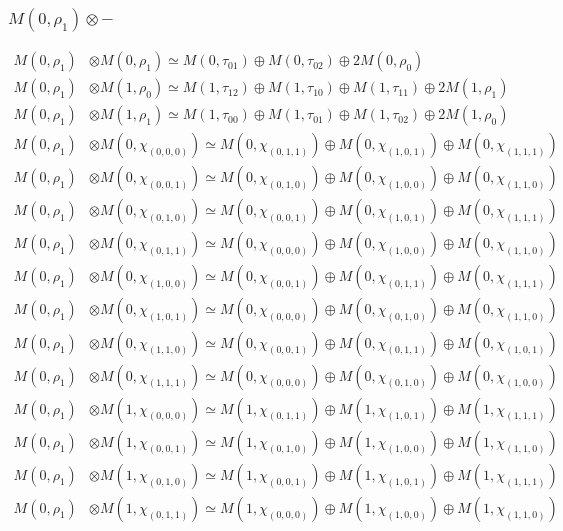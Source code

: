 \subsubsection{$ M(0,\rho_{1})\otimes -$}
\begin{align*}
M(0,\rho_{1}) &\otimes M(0,\rho_{1}) \simeq M(0,\tau_{01}) \oplus M(0,\tau_{02}) \oplus 2 M(0,\rho_{0}) \\
M(0,\rho_{1}) &\otimes M(1,\rho_{0}) \simeq M(1,\tau_{12}) \oplus M(1,\tau_{10}) \oplus M(1,\tau_{11}) \oplus 2 M(1,\rho_{1}) \\
M(0,\rho_{1}) &\otimes M(1,\rho_{1}) \simeq M(1,\tau_{00}) \oplus M(1,\tau_{01}) \oplus M(1,\tau_{02}) \oplus 2 M(1,\rho_{0}) \\
M(0,\rho_{1}) &\otimes M(0,\chi_{(0,0,0)}) \simeq M(0,\chi_{(0,1,1)}) \oplus M(0,\chi_{(1,0,1)}) \oplus M(0,\chi_{(1,1,1)}) \\
M(0,\rho_{1}) &\otimes M(0,\chi_{(0,0,1)}) \simeq M(0,\chi_{(0,1,0)}) \oplus M(0,\chi_{(1,0,0)}) \oplus M(0,\chi_{(1,1,0)}) \\
M(0,\rho_{1}) &\otimes M(0,\chi_{(0,1,0)}) \simeq M(0,\chi_{(0,0,1)}) \oplus M(0,\chi_{(1,0,1)}) \oplus M(0,\chi_{(1,1,1)}) \\
M(0,\rho_{1}) &\otimes M(0,\chi_{(0,1,1)}) \simeq M(0,\chi_{(0,0,0)}) \oplus M(0,\chi_{(1,0,0)}) \oplus M(0,\chi_{(1,1,0)}) \\
M(0,\rho_{1}) &\otimes M(0,\chi_{(1,0,0)}) \simeq M(0,\chi_{(0,0,1)}) \oplus M(0,\chi_{(0,1,1)}) \oplus M(0,\chi_{(1,1,1)}) \\
M(0,\rho_{1}) &\otimes M(0,\chi_{(1,0,1)}) \simeq M(0,\chi_{(0,0,0)}) \oplus M(0,\chi_{(0,1,0)}) \oplus M(0,\chi_{(1,1,0)}) \\
M(0,\rho_{1}) &\otimes M(0,\chi_{(1,1,0)}) \simeq M(0,\chi_{(0,0,1)}) \oplus M(0,\chi_{(0,1,1)}) \oplus M(0,\chi_{(1,0,1)}) \\
M(0,\rho_{1}) &\otimes M(0,\chi_{(1,1,1)}) \simeq M(0,\chi_{(0,0,0)}) \oplus M(0,\chi_{(0,1,0)}) \oplus M(0,\chi_{(1,0,0)}) \\
M(0,\rho_{1}) &\otimes M(1,\chi_{(0,0,0)}) \simeq M(1,\chi_{(0,1,1)}) \oplus M(1,\chi_{(1,0,1)}) \oplus M(1,\chi_{(1,1,1)}) \\
M(0,\rho_{1}) &\otimes M(1,\chi_{(0,0,1)}) \simeq M(1,\chi_{(0,1,0)}) \oplus M(1,\chi_{(1,0,0)}) \oplus M(1,\chi_{(1,1,0)}) \\
M(0,\rho_{1}) &\otimes M(1,\chi_{(0,1,0)}) \simeq M(1,\chi_{(0,0,1)}) \oplus M(1,\chi_{(1,0,1)}) \oplus M(1,\chi_{(1,1,1)}) \\
M(0,\rho_{1}) &\otimes M(1,\chi_{(0,1,1)}) \simeq M(1,\chi_{(0,0,0)}) \oplus M(1,\chi_{(1,0,0)}) \oplus M(1,\chi_{(1,1,0)}) \\

\end{align*}
